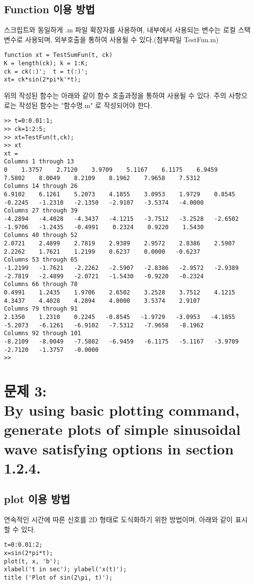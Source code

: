\documentclass[11pt
  , a4paper
  , article
  , oneside
]{memoir}
\begin{document}
\section{Function 이용 방법}
스크립트와 동일하게 .m 파일 확장자를 사용하며, 내부에서 사용되는 변수는 로컬 스택변수로 사용되며, 외부호출을 통하여 사용될 수 있다.(첨부파일 TestFun.m)
\begin{lstlisting}[style=termstyle]
function xt = TestSumFun(t, ck)
K = length(ck); k = 1:K;
ck = ck(:)';  t = t(:)';
xt= ck*sin(2*pi*k'*t);
\end{lstlisting}
위의 작성된 함수는 아래와 같이 함수 호출과정을 통하여 사용될 수 있다. 주의 사항으로는 작성된 함수는 "함수명.m" 로 작성되어야 한다. 
\begin{lstlisting}[style=termstyle]
>> t=0:0.01:1;
>> ck=1:2:5;
>> xt=TestFun(t,ck);
>> xt
xt =
Columns 1 through 13
0    1.3757    2.7120    3.9709    5.1167    6.1175    6.9459    7.5802    8.0049    8.2109    8.1962    7.9658    7.5312
Columns 14 through 26
6.9102    6.1261    5.2073    4.1855    3.0953    1.9729    0.8545   -0.2245   -1.2310   -2.1350   -2.9107   -3.5374   -4.0000
Columns 27 through 39
-4.2894   -4.4028   -4.3437   -4.1215   -3.7512   -3.2528   -2.6502   -1.9706   -1.2435   -0.4991    0.2324    0.9220    1.5430
Columns 40 through 52
2.0721    2.4899    2.7819    2.9389    2.9572    2.8386    2.5907    2.2262    1.7621    1.2199    0.6237    0.0000   -0.6237
Columns 53 through 65
-1.2199   -1.7621   -2.2262   -2.5907   -2.8386   -2.9572   -2.9389   -2.7819   -2.4899   -2.0721   -1.5430   -0.9220   -0.2324
Columns 66 through 78
0.4991    1.2435    1.9706    2.6502    3.2528    3.7512    4.1215    4.3437    4.4028    4.2894    4.0000    3.5374    2.9107
Columns 79 through 91
2.1350    1.2310    0.2245   -0.8545   -1.9729   -3.0953   -4.1855   -5.2073   -6.1261   -6.9102   -7.5312   -7.9658   -8.1962
Columns 92 through 101
-8.2109   -8.0049   -7.5802   -6.9459   -6.1175   -5.1167   -3.9709   -2.7120   -1.3757   -0.0000
>> 
\end{lstlisting}

\chapter{문제 3: \\By using basic plotting command, generate plots of simple sinusoidal wave satisfying options in section 1.2.4.}

\section{plot 이용 방법}
연속적인 시간에 따른 신호를 2D 형태로 도식화하기 위한 방법이며, 아래와 같이 표시 할 수 있다.
\begin{lstlisting}[style=termstyle]
t=0:0.01:2;
x=sin(2*pi*t);
plot(t, x, 'b');
xlabel('t in sec'); ylabel('x(t)');
title ('Plot of sin(2\pi, t)');

\end{lstlisting}
\end{document}
